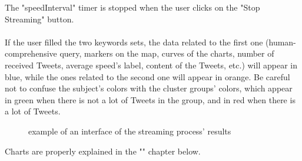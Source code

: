 \documentclass[a4paper,11pt]{report}
\begin{document}
The "speedInterval" timer is stopped when the user clicks on the "Stop Streaming" button.\\\\
If the user filled the two keywords sets, the data related to the first one (human-comprehensive query, markers on the map, curves of the charts, number of received Tweets, average speed's label, content of the Tweets, etc.) will appear in \color{blue}blue\color{black}, while the ones related to the second one will appear in \color{Orange}orange\color{black}. Be careful not to confuse the subject's colors with the cluster groups' colors, which appear in green when there is not a lot of Tweets in the group, and in red when there is a lot of Tweets.
\begin{figure}[H]
\vspace{-5pt}
\begin{center}
\vspace{-20pt}
\caption{example of an interface of the streaming process' results}
\end{center}
\end{figure}
\vspace{-10pt}

Charts are properly explained in the "" chapter below.
\bigskip
\end{document}

